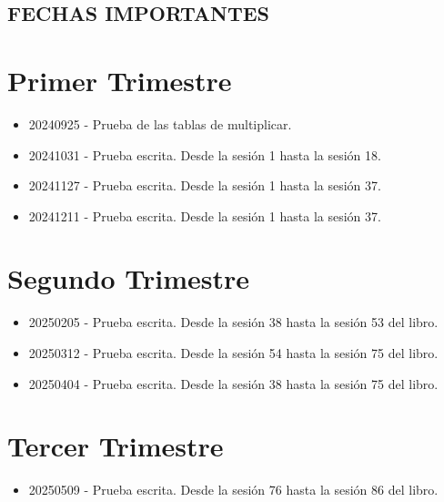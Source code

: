 \documentclass[a4paper,12pt]{article}
\begin{document}
\begin{center}
    \section*{FECHAS IMPORTANTES}
\end{center}

\tableofcontents

\newpage

\sloppy %

\section{Primer Trimestre}

\begin{itemize}
    \item 20240925 - Prueba de las tablas de multiplicar.
    \item 20241031 - Prueba escrita. Desde la sesión 1 hasta la sesión 18.
    \item 20241127 - Prueba escrita. Desde la sesión 1 hasta la sesión 37.
    \item 20241211 - Prueba escrita. Desde la sesión 1 hasta la sesión 37.
\end{itemize}

\section{Segundo Trimestre}

\begin{itemize}
    \item 20250205 - Prueba escrita. Desde la sesión 38 hasta la sesión 53 del libro.
\end{itemize}

\begin{itemize}
    \item 20250312 - Prueba escrita. Desde la sesión 54 hasta la sesión 75 del libro.
\end{itemize}

\begin{itemize}
    \item 20250404 - Prueba escrita. Desde la sesión 38 hasta la sesión 75 del libro.
\end{itemize}

\section{Tercer Trimestre}

\begin{itemize}
    \item 20250509 - Prueba escrita. Desde la sesión 76 hasta la sesión 86 del libro.
\end{itemize}
\end{document}
